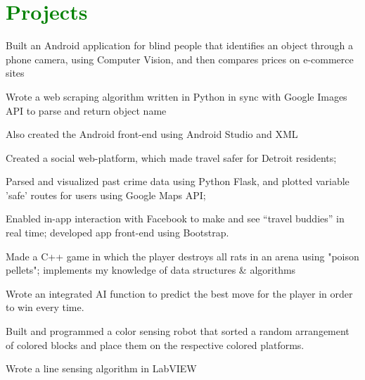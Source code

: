 \documentclass[letterpaper]{deedy-resume-openfont} %
\begin{document}
\begin{minipage}[t]{0.66\textwidth}
\section{\textcolor{GREEN}{Projects}}

\begin{tightemize}
\item Built an Android application for blind people that identifies an object through a phone camera, using Computer Vision, and then compares prices on e-commerce sites 
\item Wrote a web scraping algorithm written in Python in sync with Google Images API to parse and return object name
\item Also created the Android front-end using Android Studio and XML
\end{tightemize}

\sectionsep %

\begin{tightemize}
\item Created a social web-platform, which made travel safer for Detroit residents;
\item Parsed and visualized past crime data using Python Flask, and plotted variable 'safe' routes for users using Google Maps API;
\item Enabled in-app interaction with Facebook to make and see “travel buddies” in real time; developed app front-end using Bootstrap.
\end{tightemize}

\sectionsep %

\begin{tightemize}
\item Made a C++ game in which the player destroys all rats in an arena using "poison pellets"; implements my knowledge of data structures \& algorithms
\item Wrote an integrated AI function to predict the best move for the player in order to win every time.
\end{tightemize}

\begin{tightemize}
\item Built and programmed a color sensing robot that sorted a random arrangement of colored blocks and place them on the respective colored platforms.
\item Wrote a line sensing algorithm in LabVIEW 
\end{tightemize}
\sectionsep %




\end{minipage} %
\end{document}
